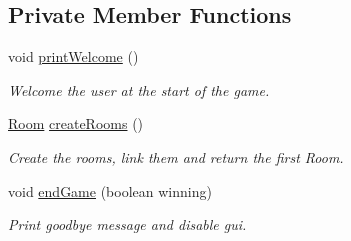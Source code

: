 \subsection*{Private Member Functions}
\begin{DoxyCompactItemize}
\item 
void \hyperlink{classpkg__game_1_1GameEngine_ab0ff9bb9fc35230d82b7e47bf55e40fd}{print\-Welcome} ()
\begin{DoxyCompactList}\small\item\em Welcome the user at the start of the game. \end{DoxyCompactList}\item 
\hyperlink{classpkg__world_1_1Room}{Room} \hyperlink{classpkg__game_1_1GameEngine_a986180eff9d235e3b619c7403accfc31}{create\-Rooms} ()
\begin{DoxyCompactList}\small\item\em Create the rooms, link them and return the first Room. \end{DoxyCompactList}\item 
void \hyperlink{classpkg__game_1_1GameEngine_a6d7340637e1eb46994a494c149442a22}{end\-Game} (boolean winning)
\begin{DoxyCompactList}\small\item\em Print goodbye message and disable gui. \end{DoxyCompactList}\end{DoxyCompactItemize}
